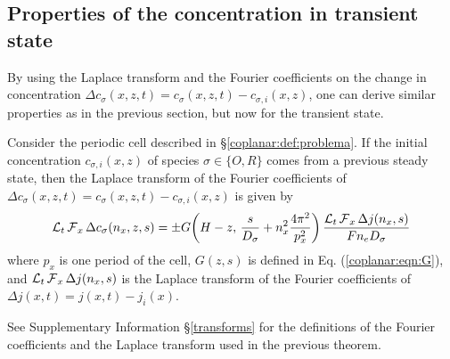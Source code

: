 \subsection{Properties of the concentration in transient state}

By using the Laplace transform and the Fourier coefficients
on the change in concentration $\Delta c_{\sigma}(x,z,t) = c_{\sigma}(x,z,t) - c_{\sigma,i}(x,z)$,
one can derive similar properties as in the previous section,
but now for the transient state.

\begin{teorema}
	\label{coplanar:teo:Dc}
	Consider the periodic cell described in \S\ref{coplanar:def:problema}.
	If the initial concentration $c_{\sigma,i}(x,z)$ of species $\sigma \in \{O, R\}$
	comes from a previous steady state,
	then the Laplace transform of the Fourier coefficients
	of $\Delta c_{\sigma}(x,z,t) = c_{\sigma}(x,z,t) - c_{\sigma,i}(x,z)$ is given by
	\begin{equation}
		\label{coplanar:eqn:Dc}
		\operatorname{\mathcal{L}}_{t} \operatorname{\mathcal{F}}_{x} \Delta c_{\sigma}(n_{x},z,s) =
		\pm G\!\left(H-z,\, \frac{s}{D_{\sigma}} + n_{x}^{2} \frac{4\pi^{2}}{p_{x}^{2}}\right)
		\frac{\operatorname{\mathcal{L}}_{t} \operatorname{\mathcal{F}}_{x} \Delta j(n_{x},s)}{F n_{e} D_{\sigma}}
	\end{equation}
	where $p_{x}$ is one period of the cell,
	$G(z,s)$ is defined in Eq. (\ref{coplanar:eqn:G}),
	and $\operatorname{\mathcal{L}}_{t}\operatorname{\mathcal{F}}_{x} \Delta j(n_{x},s)$ is the Laplace transform
	of the Fourier coefficients of $\Delta j(x,t) = j(x,t) - j_{i}(x)$.
\end{teorema}
See Supplementary Information \S\ref{transforms} for the definitions of the Fourier coefficients and the Laplace transform used in the previous theorem.

